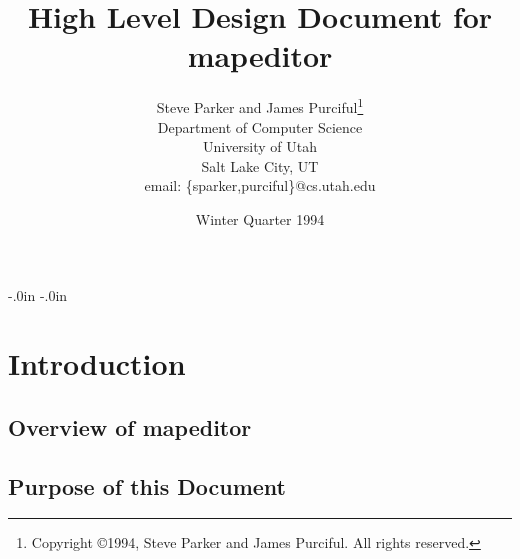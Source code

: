 % 
% 
%

\topmargin -0.45in
\textheight 9.0in
\oddsidemargin -.0in
\evensidemargin -.0in
\textwidth 6.5in





\setlength{\baselineskip}{1.2\baselineskip}

\setlength{\parskip}{\smallskipamount}


\title {High Level Design Document for\\
mapeditor}

\author {Steve Parker and James Purciful\thanks{Copyright \copyright 1994,
Steve Parker and James Purciful.  All rights reserved.}\\ 
Department of Computer Science\\ 
University of Utah\\ 
Salt Lake City, UT\\ 
email: \{sparker,purciful\}@cs.utah.edu}

\date {Winter Quarter 1994}



\maketitle

\tableofcontents



\chapter{Introduction}


\section{Overview of mapeditor}


\section{Purpose of this Document}


